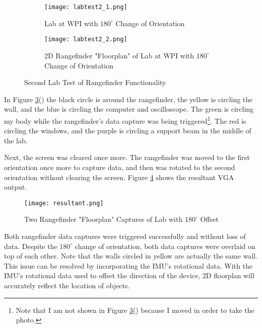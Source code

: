 \begin{figure}[H] 
	\begin{subfigure}{1\textwidth}
	\centering
		\texttt{[image: labtest2\_1.png]}
		\caption{Lab at WPI with $180^\circ$ Change of Orientation}
		\label{lab2}
	\end{subfigure}
	\begin{subfigure}{1\textwidth}
	\centering
		\texttt{[image: labtest2\_2.png]}
		\caption{2D Rangefinder "Floorplan" of Lab at WPI with $180^\circ$ Change of Orientation}
		\label{floorplan2}
	\end{subfigure}
	\caption{Second Lab Test of Rangefinder Functionality}
	\label{labtest2}
\end{figure}

In Figure \ref{labtest2}() the black circle is around the rangefinder, the yellow is circling the wall, and the blue is circling the computer and oscilloscope. The green is circling my body while the rangefinder's data capture was being triggered\footnote{Note that I am not shown in Figure \ref{labtest2}() because I moved in order to take the photo.}. The red is circling the windows, and the purple is circling a support beam in the middle of the lab.
\par
Next, the screen was cleared once more. The rangefinder was moved to the first orientation once more to capture data, and then was rotated to the second orientation without clearing the screen. Figure \ref{resultant} shows the resultant VGA output.

\begin{figure}[H]
	\centerline{\texttt{[image: resultant.png]}}
	\caption{Two Rangefinder "Floorplan" Captures of Lab with $180^\circ$ Offset}
	\label{resultant}
\end{figure}

Both rangefinder data captures were triggered successfully and without loss of data. Despite the $180^\circ$ change of orientation, both data captures were overlaid on top of each other. Note that the walls circled in yellow are actually the same wall. This issue can be resolved by incorporating the IMU's rotational data. With the IMU's rotational data used to offset the direction of the device, 2D floorplan will accurately reflect the location of objects.




